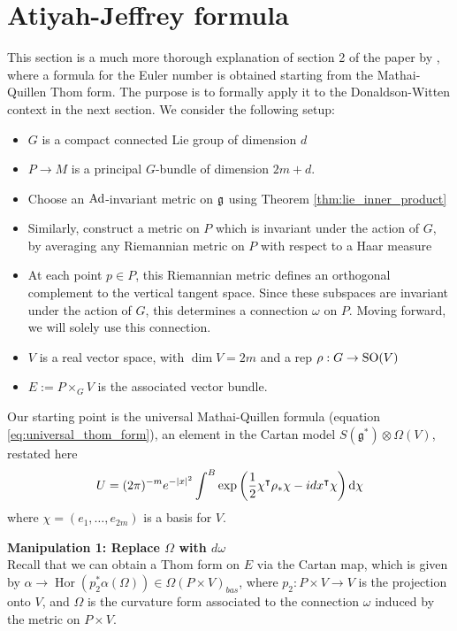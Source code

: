 \section{Atiyah-Jeffrey formula}
This section is a much more thorough explanation of section 2 of the paper by
\citet{atiyahlagrangians}, where a formula for the Euler number is obtained
starting from the Mathai-Quillen Thom form. 
The purpose is to formally apply it to the Donaldson-Witten context in the next
section. We consider the following setup: 
\begin{itemize}
	\item $G$ is a compact connected Lie group of dimension $d$
	\item $P\to M$ is a principal $G$-bundle  of dimension  $2m+d$.
	\item Choose an $\operatorname{Ad}$-invariant metric on $\operatorname{\mathfrak{g}}$ using Theorem 
		\ref{thm:lie_inner_product}
	\item Similarly, construct a metric on $P$ which is invariant under the 
		action of  $G$, by averaging any Riemannian metric on $P$ with respect 
		to a Haar measure  
	\item At each point $p\in P$, this Riemannian metric defines an orthogonal
complement to the vertical tangent space. Since these subspaces are invariant
under the action of $G$, this determines a connection  $\omega$ on  $P$.
Moving forward, we will solely use this connection.
	\item $V$ is a real vector space, with $\dim V = 2m$ and a
rep $\rho : G \to \operatorname{SO}(V)$
	\item $E:= P\times_G V$ is the associated vector bundle.
\end{itemize}

Our starting point is the universal Mathai-Quillen formula
(equation \ref{eq:universal_thom_form}), an element in the
Cartan model $S(\mathfrak{g}^*)\otimes \Omega(V)$, restated here
\begin{equation} \label{eq:universal_thom_form2}
	U = (2\pi)^{-m}e^{-\abs{x}^2}\int^B
	\exp\paren{\frac{1}{2}\chi^{\intercal}\rho_*\chi - idx^\intercal \chi}
	\odif{\chi}
\end{equation}
where $\chi = (e_1,\ldots,e_{2m})$ is a basis for $V$.

\vspace{1ex}\noindent
\textbf{Manipulation 1: Replace $\Omega$ with  $d\omega$} \\
Recall that we can obtain a Thom form on $E$ via the Cartan map, which is given
by $\alpha\to \operatorname{Hor}(p_2^*\alpha(\Omega)) \in \Omega(P\times V)_{bas}$, 
where $p_2:P\times V\to V$ is the projection onto $V$, and $\Omega$ is the
curvature form associated to the connection $\omega$ induced by the
metric on $P\times V$.

